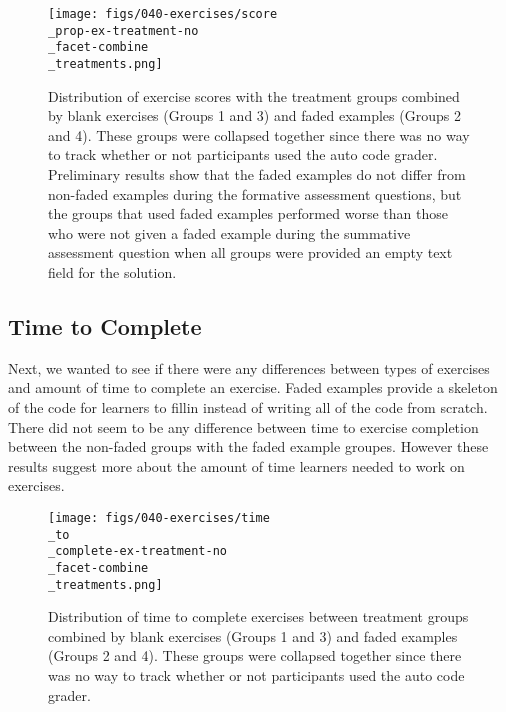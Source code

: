 \documentclass[040-assessment.tex]{subfiles}
\begin{document}
    \begin{figure}[htb]
        \centering
        \texttt{[image: figs/040-exercises/score\\\_prop-ex-treatment-no\\\_facet-combine\\\_treatments.png]}
        \caption[Graded Exercise Scores with combined treatment groups]
        {Distribution of exercise scores with the treatment groups combined by
        blank exercises (Groups 1 and 3) and faded examples (Groups 2 and 4).
        These groups were collapsed together since there was no way to track whether or not
        participants used the auto code grader.
        Preliminary results show that the faded examples do not differ from non-faded examples during
        the formative assessment questions,
        but the groups that used faded examples performed worse than those who were not given a faded example
        during the summative assessment question when all groups were provided an empty text field for the solution.
        }
        \label{fig:exercise-scores-combined-treatments}
    \end{figure}

\subsection{Time to Complete}

    Next, we wanted to see if there were any differences between types of exercises and amount of time to complete an exercise.
    Faded examples provide a skeleton of the code for learners to fillin instead of writing all of the code from scratch.
    There did not seem to be any difference between time to exercise completion between the non-faded groups with the
    faded example groupes.
    However these results suggest more about the amount of time learners needed to work on exercises.

    \begin{figure}[htb]
        \centering
        \texttt{[image: figs/040-exercises/time\\\_to\\\_complete-ex-treatment-no\\\_facet-combine\\\_treatments.png]}
        \caption[Time to complete exercises with combined treatment groups]
        {Distribution of time to complete exercises between treatment groups combined by
        blank exercises (Groups 1 and 3) and faded examples (Groups 2 and 4).
        These groups were collapsed together since there was no way to track whether or not
        participants used the auto code grader.
        }
        \label{fig:time-to-complete-combined-treatments}
    \end{figure}
\end{document}
